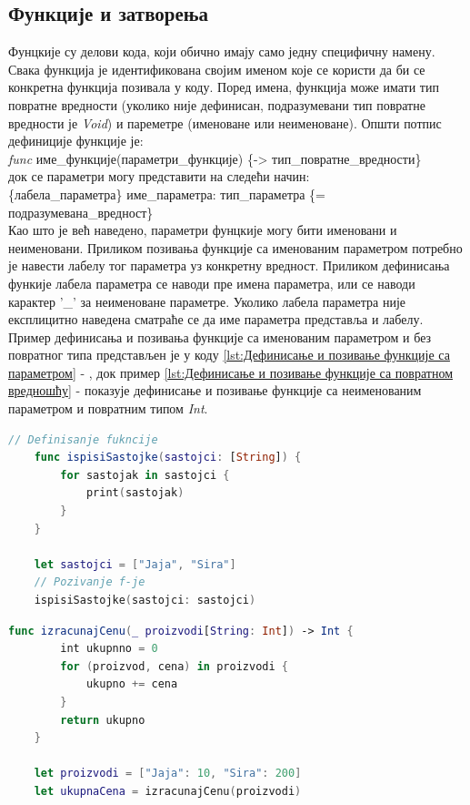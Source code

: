 \documentclass[12pt,oneside]{memoir}
\begin{document}
\subsection{Функције и затворења}

\indent Фунцкије су делови кода, који обично имају само једну специфичну намену. Свака функција је идентификована својим именом које се користи да би се конкретна функција позивала у коду. Поред имена, функција може имати тип повратне вредности (уколико није дефинисан, подразумевани тип повратне вредности је \textit{Void}) и пареметре (именоване или неименоване). Општи потпис дефиниције функције је:\\ \textit{func} име\_функције(параметри\_функције) \{-> тип\_повратне\_вредности\}\\ док се параметри могу представити на следећи начин: \\
\{лабела\_параметра\} име\_параметра: тип\_параметра \{= подразумевана\_вредност\}
\\
\indent Као што је већ наведено, параметри фунцкије могу бити именовани и неименовани. Приликом позивања функције са именованим параметром потребно је навести лабелу тог параметра уз конкретну вредност. Приликом дефинисања функије лабела параметра се наводи пре имена параметра, или се наводи карактер '\_' за неименоване параметре. Уколико лабела параметра није експлицитно наведена сматраће се да име параметра представља и лабелу. Пример дефинисања и позивања функције са именованим параметром и без повратног типа представљен је у коду \ref{lst:Дефинисање и позивање функције са параметром} - , док пример \ref{lst:Дефинисање и позивање функције са повратном вредношћу} -  показује дефинисање и позивање функције са неименованим параметром и повратним типом \textit{Int}.

\begin{lstlisting}[caption=\textit{{Дефинисање и позивање функције са параметром}}, label={lst:Дефинисање и позивање функције са параметром}, language=Swift, frame=single]
    // Definisanje fukncije
    func ispisiSastojke(sastojci: [String]) {
        for sastojak in sastojci {
            print(sastojak)
        }
    }
    
    let sastojci = ["Jaja", "Sira"]
    // Pozivanje f-je
    ispisiSastojke(sastojci: sastojci)
\end{lstlisting}

\begin{lstlisting}[caption=\textit{{Дефинисање и позивање функције са повратном вредношћу}}, label={lst:Дефинисање и позивање функције са повратном вредношћу}, language=Swift, frame=single]
    func izracunajCenu(_ proizvodi[String: Int]) -> Int {
        int ukupnno = 0
        for (proizvod, cena) in proizvodi {
            ukupno += cena
        }
        return ukupno
    }
    
    let proizvodi = ["Jaja": 10, "Sira": 200]
    let ukupnaCena = izracunajCenu(proizvodi)
\end{lstlisting}
    
\end{document}
